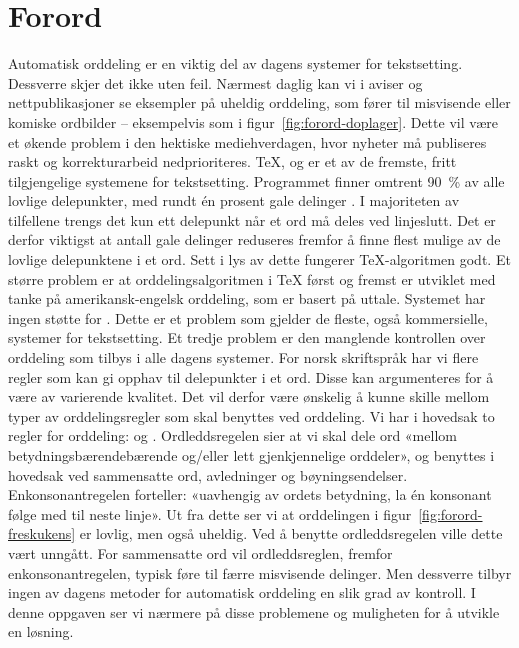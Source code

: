 \chapter*{Forord}

Automatisk orddeling er en viktig del av dagens systemer for tekstsetting. Dessverre skjer det ikke uten feil. Nærmest daglig kan vi i aviser og nettpublikasjoner se eksempler på uheldig orddeling, som fører til misvisende eller komiske ordbilder -- eksempelvis som i figur~\ref{fig:forord-doplager}. Dette vil være et økende problem i den hektiske mediehverdagen, hvor nyheter må publiseres raskt og korrekturarbeid nedprioriteres. \TeX{}, og er et av de fremste, fritt tilgjengelige systemene for tekstsetting. Programmet finner omtrent 90~\% av alle lovlige delepunkter, med rundt én prosent gale delinger \cite{thoresen1993virtuelle}. I majoriteten av tilfellene trengs det kun ett delepunkt når et ord må deles ved linjeslutt. Det er derfor viktigst at antall gale delinger reduseres fremfor å finne flest mulige av de lovlige delepunktene i et ord. Sett i lys av dette fungerer \TeX{}-algoritmen godt. Et større problem er at orddelingsalgoritmen i \TeX{} først og fremst er utviklet med tanke på amerikansk-engelsk orddeling, som er basert på uttale. Systemet har ingen støtte for . Dette er et problem som gjelder de fleste, også kommersielle, systemer for tekstsetting. Et tredje problem er den manglende kontrollen over orddeling som tilbys i alle dagens systemer. For norsk skriftspråk har vi flere regler som kan gi opphav til delepunkter i et ord. Disse kan argumenteres for å være av varierende kvalitet. Det vil derfor være ønskelig å kunne skille mellom typer av orddelingsregler som skal benyttes ved orddeling. Vi har i hovedsak to regler for orddeling:  og . Ordleddsregelen sier at vi skal dele ord «mellom betydningsbærendebærende og/eller lett gjenkjennelige orddeler», og benyttes i hovedsak ved sammensatte ord, avledninger og bøyningsendelser. Enkonsonantregelen forteller: «uavhengig av ordets betydning, la én konsonant følge med til neste linje». \cite{vinje} Ut fra dette ser vi at orddelingen i figur~\ref{fig:forord-freskukens} er lovlig, men også uheldig. Ved å benytte ordleddsregelen ville dette vært unngått. For sammensatte ord vil ordleddsreglen, fremfor enkonsonantregelen, typisk føre til færre misvisende delinger. Men dessverre tilbyr ingen av dagens metoder for automatisk orddeling en slik grad av kontroll. I denne oppgaven ser vi nærmere på disse problemene og muligheten for å utvikle en løsning.

